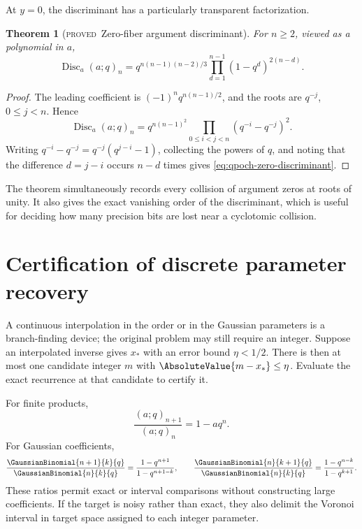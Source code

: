 \documentclass[11pt,letterpaper,oneside,openany]{book}
\newtheorem{theorem}{Theorem}[chapter]
\theoremstyle{definition}
\theoremstyle{remark}
\newcommand{\Disc}{\operatorname{Disc}}
\newcommand{\statusproved}{\textcolor{provedgreen}{\textsc{proved}}}
\begin{document}
At \(y=0\), the discriminant has a particularly transparent factorization.

\begin{theorem}[\statusproved\ Zero-fiber argument discriminant]
For \(n\ge2\), viewed as a polynomial in \(a\),
\begin{equation}\label{eq:qpoch-zero-discriminant}
 \Disc_a (a;q)_n
 =q^{n(n-1)(n-2)/3}
  \prod_{d=1}^{n-1}(1-q^d)^{2(n-d)}.
\end{equation}
\end{theorem}
\begin{proof}
The leading coefficient is
\((-1)^nq^{n(n-1)/2}\), and the roots are \(q^{-j}\), \(0\le j<n\).  Hence
\[
 \Disc_a(a;q)_n=
 q^{n(n-1)^2}
 \prod_{0\le i<j<n}(q^{-i}-q^{-j})^2.
\]
Writing
\(q^{-i}-q^{-j}=q^{-j}(q^{j-i}-1)\), collecting the powers of \(q\), and
noting that the difference \(d=j-i\) occurs \(n-d\) times gives
\eqref{eq:qpoch-zero-discriminant}.
\end{proof}

The theorem simultaneously records every collision of argument zeros at roots
of unity.  It also gives the exact vanishing order of the discriminant, which
is useful for deciding how many precision bits are lost near a cyclotomic
collision.

\section{Certification of discrete parameter recovery}
A continuous interpolation in the order or in the Gaussian parameters is a
branch-finding device; the original problem may still require an integer.
Suppose an interpolated inverse gives \(x_*\) with an error bound \(\eta<1/2\).
There is then at most one candidate integer \(m\) with
\(\AbsoluteValue{m-x_*}\le\eta\).  Evaluate the exact recurrence at that candidate to
certify it.

For finite products,
\[
 \frac{(a;q)_{n+1}}{(a;q)_n}=1-aq^n.
\]
For Gaussian coefficients,
\begin{equation}\label{eq:gaussian-ratio-discrete}
 \frac{\GaussianBinomial{n+1}{k}{q}}{\GaussianBinomial{n}{k}{q}}
 =\frac{1-q^{n+1}}{1-q^{n+1-k}},
 \qquad
 \frac{\GaussianBinomial{n}{k+1}{q}}{\GaussianBinomial{n}{k}{q}}
 =\frac{1-q^{n-k}}{1-q^{k+1}}.
\end{equation}
These ratios permit exact or interval comparisons without constructing large
coefficients.  If the target is noisy rather than exact, they also delimit the
Voronoi interval in target space assigned to each integer parameter.
\end{document}
